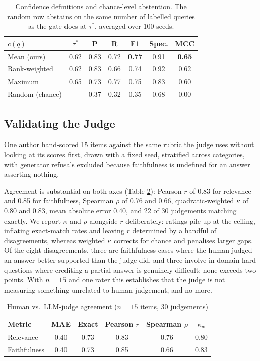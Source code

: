 \documentclass[conference]{IEEEtran}
\begin{document}
\begin{table}[htbp]
\centering
\caption{Confidence definitions and chance-level abstention. The random row abstains on the same number of labelled queries as the gate does at $\tau^\ast$, averaged over 100 seeds.}
\label{tab:variants}
\begin{tabular}{@{}lcccccc@{}}
\toprule
$c(q)$ & $\tau^\ast$ & P & R & F1 & Spec. & MCC \\
\midrule
Mean (ours) & 0.62 & 0.83 & 0.72 & \textbf{0.77} & 0.91 & \textbf{0.65} \\
Rank-weighted & 0.62 & 0.83 & 0.66 & 0.74 & 0.92 & 0.62 \\
Maximum & 0.65 & 0.73 & 0.77 & 0.75 & 0.83 & 0.60 \\
\midrule
Random (chance) & -- & 0.37 & 0.32 & 0.35 & 0.68 & 0.00 \\
\bottomrule
\end{tabular}
\end{table}

\subsection{Validating the Judge}
\label{sec:judge-validation}

One author hand-scored 15 items against the same rubric the judge uses without looking at its scores first, drawn with a fixed seed, stratified across categories, with generator refusals excluded because faithfulness is undefined for an answer asserting nothing.

Agreement is substantial on both axes (Table \ref{tab:humanagreement}): Pearson $r$ of 0.83 for relevance and 0.85 for faithfulness, Spearman $\rho$ of 0.76 and 0.66, quadratic-weighted $\kappa$ of 0.80 and 0.83, mean absolute error 0.40, and 22 of 30 judgements matching exactly. We report $\kappa$ and $\rho$ alongside $r$ deliberately: ratings pile up at the ceiling, inflating exact-match rates and leaving $r$ determined by a handful of disagreements, whereas weighted $\kappa$ corrects for chance and penalises larger gaps. Of the eight disagreements, three are faithfulness cases where the human judged an answer better supported than the judge did, and three involve in-domain hard questions where crediting a partial answer is genuinely difficult; none exceeds two points. With $n = 15$ and one rater this establishes that the judge is not measuring something unrelated to human judgement, and no more.

\begin{table}[htbp]
\centering
\caption{Human vs.\ LLM-judge agreement ($n = 15$ items, 30 judgements)}
\label{tab:humanagreement}
\begin{tabular}{@{}lccccc@{}}
\toprule
Metric & MAE & Exact & Pearson $r$ & Spearman $\rho$ & $\kappa_w$ \\
\midrule
Relevance & 0.40 & 0.73 & 0.83 & 0.76 & 0.80 \\
Faithfulness & 0.40 & 0.73 & 0.85 & 0.66 & 0.83 \\
\bottomrule
\end{tabular}
\end{table}
\end{document}
